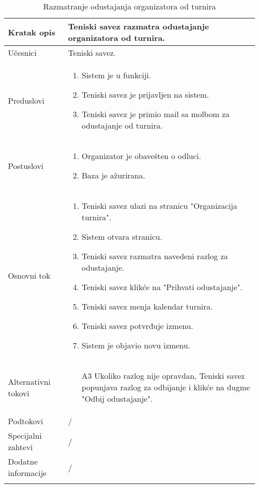 \documentclass{article}
\begin{document}
 \begin{longtable}{| p{} | p{} |} 
            \hline
                Kratak opis & Teniski savez razmatra odustajanje organizatora od turnira. \\ 
            \hline    
                Učesnici & Teniski savez.\\
            \hline
               Preduslovi & \begin{enumerate}
                   \item Sistem je u funkciji.
                   \item Teniski savez je prijavljen na sistem. 
                   \item Teniski savez je primio mail sa molbom za odustajanje od turnira.
                \end{enumerate}\\
            \hline  
                Postuslovi & \begin{enumerate}
                   \item Organizator je obavešten o odluci.
                   \item Baza je ažurirana. 
                \end{enumerate}\\
            \hline
                Osnovni tok & \begin{enumerate}
                    \item Teniski savez ulazi na stranicu "Organizacija turnira".
                    \item Sistem otvara stranicu.
                    \item Teniski savez razmatra navedeni razlog za odustajanje.
                    \item Teniski savez klikće na "Prihvati odustajanje".
                    \item Teniski savez menja kalendar turnira.
                    \item Teniski savez potvrđuje izmenu.
                    \item Sistem je objavio novu izmenu.
                \end{enumerate}\\
            \hline
                Alternativni tokovi & 
                \begin{itemize}
                    \item[A3] Ukoliko razlog nije opravdan, Teniski savez popunjava razlog za odbijanje i klikće na dugme "Odbij odustajanje".
                \end{itemize}\\
            \hline
                Podtokovi & /\\
            \hline
                Specijalni zahtevi & /\\
            \hline
                Dodatne informacije & /\\
            \hline
            \caption{Razmatranje odustajanja organizatora od turnira}
        \end{longtable}
\end{document}
